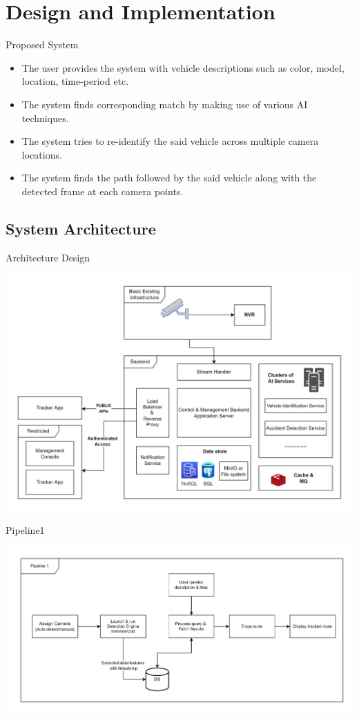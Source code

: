 \documentclass{beamer}
\begin{document}
	\section{Design and Implementation}
	\begin{frame}{Proposed System}
		\begin{itemize}
			\item The user provides the system with vehicle descriptions such as color, model, location, time-period etc. 
			\item The system finds corresponding match by making use of various AI techniques. 
			\item The system tries to re-identify the said vehicle across multiple camera locations.
			\item The system finds the path followed by the said vehicle along with the detected frame at each camera points.
		\end{itemize}
	\end{frame}
	
	\subsection{System Architecture}
	\begin{frame}{Architecture Design}
		\begin{center}
			\includegraphics[width=\linewidth]{res/architecture_high_level}
		\end{center}
	\end{frame}

	\begin{frame}{Pipeline1}
		\begin{center}
			\includegraphics[width=\linewidth]{res/pipeline1}
		\end{center}
	\end{frame}
\end{document}
